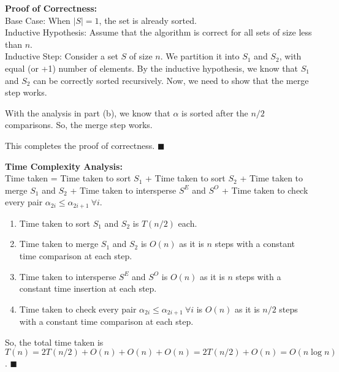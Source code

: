 \documentclass[a4paper]{article}
\begin{document}
\begin{enumerate}
\begin{enumerate}
    \textbf{Proof of Correctness:}\\
    Base Case: When $|S| = 1$, the set is already sorted.\\

    Inductive Hypothesis: Assume that the algorithm is correct for all sets of size less than $n$.\\

    Inductive Step: Consider a set $S$ of size $n$. We partition it into $S_1$ and $S_2$, with equal (or +1) number of elements. By the inductive hypothesis, we know that $S_1$ and $S_2$ can be correctly sorted recursively. Now, we need to show that the merge step works.

    With the analysis in part (b), we know that $\alpha$ is sorted after the $n/2$ comparisons. So, the merge step works.


    This completes the proof of correctness. $\blacksquare$\\
   \end{enumerate}

   \textbf{Time Complexity Analysis:}\\

   Time taken = Time taken to sort $S_1$ + Time taken to sort $S_2$ + Time taken to merge $S_1$ and $S_2$ + Time taken to intersperse $S^E$ and $S^O$ + Time taken to check every pair $\alpha_{2i} \leq \alpha_{2i+1}\ \forall i$.

   \begin{enumerate}
    \item Time taken to sort $S_1$ and $S_2$ is $T(n/2)$ each.
    \item Time taken to merge $S_1$ and $S_2$ is $O(n)$ as it is $n$ steps with a constant time comparison at each step.
    \item Time taken to intersperse $S^E$ and $S^O$ is $O(n)$ as it is $n$ steps with a constant time insertion at each step.
    \item Time taken to check every pair $\alpha_{2i} \leq \alpha_{2i+1}\ \forall i$ is $O(n)$ as it is $n/2$ steps with a constant time comparison at each step.
   \end{enumerate}

   So, the total time taken is $T(n) = 2T(n/2) + O(n) + O(n) + O(n) = 2T(n/2) + O(n) = O(n\log n)$. $\blacksquare$\\


    
    

\end{enumerate}
\end{document}
